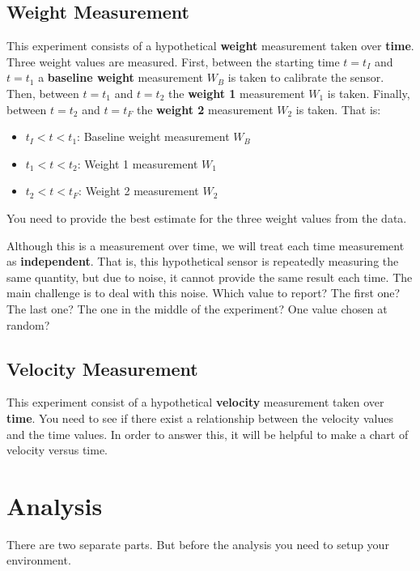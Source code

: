 \subsection{Weight Measurement}
This experiment consists of a hypothetical \textbf{weight} measurement taken over \textbf{time}. Three weight values are measured. First, between the starting time $t = t_{I}$ and $t = t_{1}$ a \textbf{baseline weight} measurement $W_{B}$ is taken to calibrate the sensor. Then, between $t = t_{1}$ and $t = t_{2}$ the \textbf{weight 1} measurement $W_{1}$ is taken. Finally, between $t = t_{2}$ and $t = t_{F}$ the \textbf{weight 2} measurement $W_{2}$ is taken. That is:
\begin{itemize}
    \item $t_{I} < t < t_{1}$: Baseline weight measurement $W_{B}$
    \item $t_{1} < t < t_{2}$: Weight 1 measurement $W_{1}$
    \item $t_{2} < t < t_{F}$: Weight 2 measurement $W_{2}$
\end{itemize}
You need to provide the best estimate for the three weight values from the data.

Although this is a measurement over time, we will treat each time measurement as \textbf{independent}. That is, this hypothetical sensor is repeatedly measuring the same quantity, but due to noise, it cannot provide the same result each time. The main challenge is to deal with this noise. Which value to report? The first one? The last one? The one in the middle of the experiment? One value chosen at random?
\subsection{Velocity Measurement}
This experiment consist of a hypothetical \textbf{velocity} measurement taken over \textbf{time}. You need to see if there exist a relationship between the velocity values and the time values. In order to answer this, it will be helpful to make a chart of velocity versus time.
\section{Analysis}
There are two separate parts. But before the analysis you need to setup your environment.
